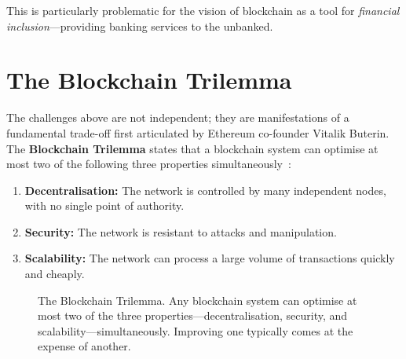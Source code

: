 This is particularly problematic for the vision of blockchain as a tool for \emph{financial inclusion}---providing banking services to the unbanked.

\section{The Blockchain Trilemma}
\label{sec:trilemma}

The challenges above are not independent; they are manifestations of a fundamental trade-off first articulated by Ethereum co-founder Vitalik Buterin. The \textbf{Blockchain Trilemma} states that a blockchain system can optimise at most two of the following three properties simultaneously~\cite{dai2019trilemma}:

\begin{enumerate}
    \item \textbf{Decentralisation:} The network is controlled by many independent nodes, with no single point of authority.
    \item \textbf{Security:} The network is resistant to attacks and manipulation.
    \item \textbf{Scalability:} The network can process a large volume of transactions quickly and cheaply.
\end{enumerate}

\begin{figure}[htbp]
\centering
{}
\caption{The Blockchain Trilemma. Any blockchain system can optimise at most two of the three properties---decentralisation, security, and scalability---simultaneously. Improving one typically comes at the expense of another.}
\label{fig:trilemma}
\end{figure}

